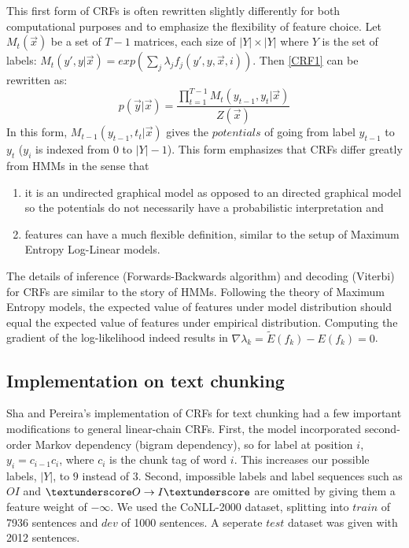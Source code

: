 \documentclass{article}
\begin{document}
This first form of CRFs is often rewritten slightly differently for both computational purposes and to emphasize the flexibility of feature choice. Let $M_{t}(\vec{x})$ be a set of $T-1$ matrices, each size of $|Y| \times|Y|$ where $Y$ is the set of labels: $M_{t}(y',y|\vec{x})=exp(\sum_{j}\lambda_{j}f_{j}(y',y,\vec{x},i))$. Then \ref{CRF1} can be rewritten as:
\begin{equation}
\label{CRF2}
p(\vec{y}|\vec{x})=\frac{\prod_{t=1}^{T-1}M_{t}(y_{t-1},y_{t}|\vec{x})}{Z(\vec{x})}
\end{equation}
In this form, $M_{t-1}(y_{t-1}, t_{t}|\vec{x})$ gives the $potentials$ of going from label $y_{t-1}$ to $y_{t}$ ($y_{i}$ is indexed from $0$ to $|Y|-1$). This form emphasizes that CRFs differ greatly from HMMs in the sense that 
\begin{enumerate}
\item it is an undirected graphical model as opposed to an directed graphical model so the potentials do not necessarily have a probabilistic interpretation and 
\item features can have a much flexible definition, similar to the setup of Maximum Entropy Log-Linear models.
\end{enumerate}

The details of inference (Forwards-Backwards algorithm) and decoding (Viterbi) for CRFs are similar to the story of HMMs. Following the theory of Maximum Entropy models, the expected value of features under model distribution should equal the expected value of features under empirical distribution. Computing the gradient of the log-likelihood indeed results in $\nabla\lambda_{k}=\tilde{E}(f_{k})-E(f_{k})=0$. 


\subsection*{Implementation on text chunking}
Sha and Pereira's implementation of CRFs for text chunking had a few important modifications to general linear-chain CRFs. First, the model incorporated second-order Markov dependency (bigram dependency), so for label at position $i$, $y_{i}=c_{i-1}c_{i}$, where $c_{i}$ is the chunk tag of word $i$. This increases our possible labels, $|Y|$, to $9$ instead of $3$. Second, impossible labels and label sequences such as $OI$ and $\textunderscore O \rightarrow I\textunderscore$ are omitted by giving them a feature weight of $-\infty$. We used the CoNLL-2000 dataset, splitting into $train$ of 7936 sentences and $dev$ of 1000 sentences. A seperate $test$ dataset was given with 2012 sentences.
\end{document}
